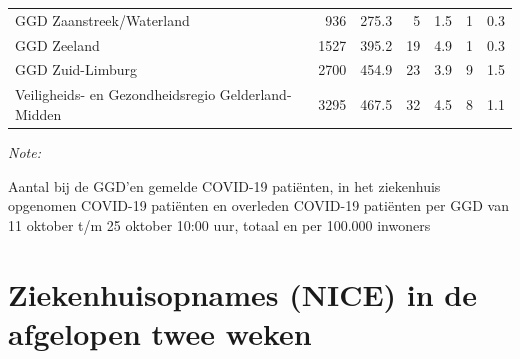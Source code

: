 \documentclass[
  english,
  man,floatsintext]{apa6}
\begin{document}
\begin{table}
\begin{threeparttable}
\begin{tabular}{lrrrrrr}
GGD Zaanstreek/Waterland & 936 & 275.3 & 5 & 1.5 & 1 & 0.3\\
GGD Zeeland & 1527 & 395.2 & 19 & 4.9 & 1 & 0.3\\
GGD Zuid-Limburg & 2700 & 454.9 & 23 & 3.9 & 9 & 1.5\\
Veiligheids- en Gezondheidsregio Gelderland-Midden & 3295 & 467.5 & 32 & 4.5 & 8 & 1.1\\
\bottomrule
\end{tabular}
\begin{tablenotes}
\item \textit{Note: } 
\item Aantal bij de GGD’en gemelde COVID-19 patiënten, in het ziekenhuis opgenomen COVID-19 patiënten en overleden COVID-19 patiënten per GGD van 11 oktober t/m 25 oktober 10:00 uur, totaal en per 100.000 inwoners
\end{tablenotes}
\end{threeparttable}
\endgroup{}
\end{table}

\newpage

\hypertarget{ziekenhuisopnames-nice-in-de-afgelopen-twee-weken}{%
\section{Ziekenhuisopnames (NICE) in de afgelopen twee weken}\label{ziekenhuisopnames-nice-in-de-afgelopen-twee-weken}}
\end{document}
